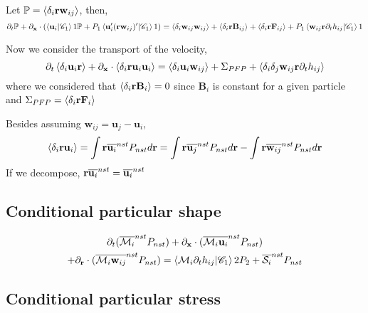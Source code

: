 Let $\mathbb{P} = \left<\delta_i \textbf{rw}_{ij}\right>$, then, 
\begin{equation*}
    \partial_t \mathbb{P} 
  + \partial_\textbf{x} \cdot (\left<\textbf{u}_i | \mathscr{C}_1\right>{1} \mathbb{P}
  + P_1\left<\textbf{u}_i' (\textbf{r}\textbf{w}_{ij})' | \mathscr{C}_1\right>{1})
  = \left<\delta_i\textbf{w}_{ij}\textbf{w}_{ij}\right>
  + \left<\delta_i\textbf{r} \textbf{B}_{ij}\right> 
  + \left<\delta_i\textbf{r} \textbf{F}_{ij}\right> 
  + P_1\left<\textbf{w}_{ij}\textbf{r}\partial_t h_{ij} | \mathscr{C}_1\right>{1}
\end{equation*}

Now we consider the transport of the velocity, 
\begin{equation*}
    \partial_t \left<\delta_i\textbf{u}_{i}\textbf{r}\right> 
  + \partial_\textbf{x} \cdot \left<\delta_i \textbf{r}\textbf{u}_i\textbf{u}_{i}\right>
  = \left<\delta_i\textbf{u}_{i}\textbf{w}_{ij}\right>
  + \Sigma_{PFP}
  + \left<\delta_i\delta_{j}\textbf{w}_{ij}\textbf{r}\partial_t h_{ij} \right>
\end{equation*}
where we considered that $\left<\delta_i\textbf{r} \textbf{B}_{i}\right> = 0 $ since $\textbf{B}_i$ is constant for a given particle and $\Sigma_{PFP} = \left<\delta_i\textbf{r} \textbf{F}_{i}\right>$ 



Besides assuming $\textbf{w}_{ij} = \textbf{u}_j - \textbf{u}_i$, 
\begin{equation}
    \left<\delta_i \textbf{ru}_{i}\right>
    = 
    \int{\textbf{r}\overline{\textbf{u}_{i}}^{nst}} P_{nst}d\textbf{r}
    = \int{\textbf{r}\overline{\textbf{u}_{j}}^{nst}} P_{nst}d\textbf{r}
    - \int{\textbf{r}\overline{\textbf{w}_{ij}}^{nst}} P_{nst}d\textbf{r}
\end{equation}
If we decompose, $\textbf{r}\overline{\textbf{u}_{i}}^{nst} = \overline{\textbf{u}_{i}}^{nst}$
\subsection*{Conditional particular shape}
\begin{multline*}
    \partial_t (\overline{\mathcal{M}_{i}}^{nst} P_{nst}) 
    + \partial_\textbf{x} \cdot ( \overline{\mathcal{M}_{i}\textbf{u}_i}^{nst} P_{nst})\\
    + \partial_\textbf{r} \cdot ( \overline{\mathcal{M}_{i}\textbf{w}_{ij}}^{nst} P_{nst}) 
    = 
    \left<\mathcal{M}_{i}\partial_t h_{ij} | \mathscr{C}_1\right>{2}P_2
    + \overline{\mathcal{S}_i}^{nst}P_{nst}
\end{multline*}
\subsection*{Conditional particular stress}

